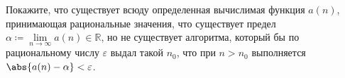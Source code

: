 Покажите, что существует всюду определенная вычислимая функция $a(n)$, принимающая рациональные значения,
что существует предел $\alpha \coloneqq \lim\limits_{n \to \infty} a(n) \in \mathbb{R}$, но не существует
алгоритма, который бы по рациональному числу $\varepsilon$ выдал такой $n_0$, что при $n > n_0$
выполняется $\abs{a(n) - \alpha} < \varepsilon$.